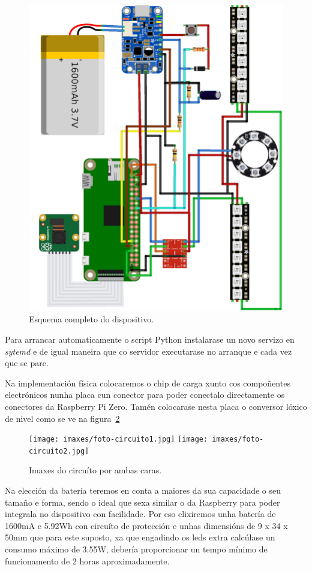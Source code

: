 \begin{itemize}
    \begin{figure}[tb]
      \centering
    	\includegraphics[scale=1]{imaxes/esquema-completo.png}
    	\caption{Esquema completo do dispositivo.}
    	\label{fig:esquema_dispositivo}
    \end{figure}

    Para arrancar automaticamente o script Python instalarase un novo servizo en \emph{sytemd} e de igual maneira que co servidor executarase no arranque e cada vez que se pare.

    Na implementación física colocaremos o chip de carga xunto cos compoñentes electrónicos nunha placa cun conector para poder conectalo directamente os conectores da Raspberry Pi Zero. Tamén colocarase nesta placa o conversor lóxico de nivel como se ve na figura~\ref{fig:fotos_reverso}

    \begin{figure}[tb]
      \centering
    	\texttt{[image: imaxes/foto-circuito1.jpg]}
    	\texttt{[image: imaxes/foto-circuito2.jpg]}
    	\caption{Imaxes do circuíto por ambas caras.}
    	\label{fig:fotos_reverso}
    \end{figure}

    Na elección da batería teremos en conta a maiores da sua capacidade o seu tamaño e forma, sendo o ideal que sexa similar o da Raspberry para poder integrala no dispositivo con facilidade. Por eso elixiremos unha batería de 1600mA e 5.92Wh con circuíto de protección e unhas dimensións de 9 x 34 x 50mm que para este suposto, xa que engadindo os leds extra calcúlase un consumo máximo de 3.55W, debería proporcionar un tempo mínimo de funcionamento de 2 horas aproximadamente.

\end{itemize}

